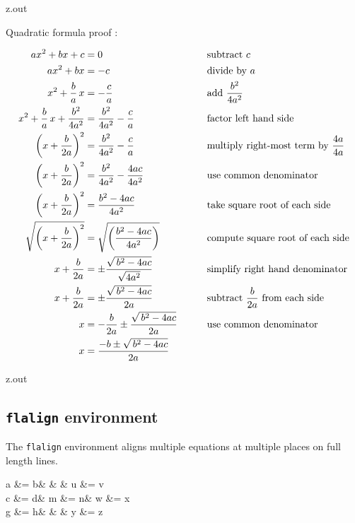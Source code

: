 \begin{VerbatimOut}{z.out}
  
Quadratic formula proof \cite{khan}:

{
  \addtolength{\jot}{6pt}
  \begin{alignat}{2}
    ax^2 + bx + c
      &= 0
      &
      &\text{subtract $c$}\\
    ax^2 + bx
      &= -c
      &
      &\text{divide by $a$}\notag\\
    x^2 + \frac ba\,x
      &= -\frac ca
      &
      &\text{add $\displaystyle\frac{b^2}{4a^2}$}\notag\\
    x^2+\frac ba\,x+\frac{b^2}{4a^2}
      &= \frac{b^2}{4a^2}-\frac ca
      &
      &\text{factor left hand side}\notag\\
    \left(x+\frac b{2a}\right)^2
      &= \frac{b^2}{4a^2}-\frac ca
      &
      &\text{multiply right-most term by $\displaystyle\frac{4a}{4a}$}\notag\\
    \left(x + \frac b{2a}\right)^2
      &= \frac{b^2}{4a^2}-\frac{4ac}{4a^2}
      &
      &\text{use common denominator}\notag\\
    \left(x + \frac b{2a}\right)^2
      &= \frac{b^2-4ac}{4a^2}
      &
      &\text{take square root of each side}\notag\\
    \sqrt{\left(x + \frac b{2a}\right)^2}
      &= \sqrt{\left(\frac{b^2-4ac}{4a^2}\right)}
      &
      &\text{compute square root of each side}\notag\\
    x + \frac b{2a}
      &= \pm \frac{\sqrt{\,b^2-4ac}}{\sqrt{4a^2}}
      &
      &\text{simplify right hand denominator}\notag\\
    x + \frac b{2a}
      &= \pm \frac{\sqrt{\,b^2-4ac}}{2a}
      &
      &\text{subtract $\displaystyle\frac b{2a}$ from each side}\notag\\
    x
      &= -\frac b{2a} \pm \frac{\sqrt{\,b^2-4ac}}{2a}
      &\qquad
      &\text{use common denominator}\notag\\
    x
      &= \frac{-b \pm \sqrt{\,b^2-4ac}}{2a}
  \end{alignat}
}
\end{VerbatimOut}

\MyIOS


\begin{VerbatimOut}{z.out}

\subsection{\texttt{flalign} environment}

The \verb+flalign+ environment aligns multiple equations at multiple places
on full length lines.

\begin{flalign}
  a &= b&   &   & u &= v\\
  c &= d& m &= n& w &= x\notag\\
  g &= h&   &   & y &= z
\end{flalign}
\end{VerbatimOut}

